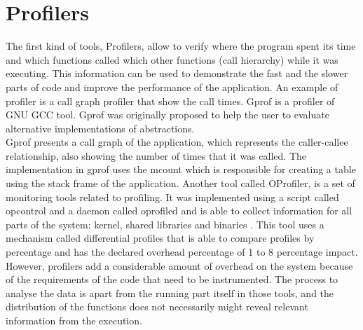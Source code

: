 \section{Profilers}
The first kind of tools, Profilers, allow to verify where the program spent its time and which functions called which other functions (call hierarchy) while it was executing. This information can be used to demonstrate the fast and the slower parts of code and improve the performance of the application.
An example of profiler is a call graph profiler that show the call times. Gprof is a profiler of GNU GCC tool. Gprof was originally proposed to help the user to evaluate alternative implementations of abstractions.\\
Gprof presents a call graph of the application, which represents the caller-callee relationship, also showing the number of times that it was called. The implementation in gprof uses the mcount which is responsible for creating a table using the stack frame of the application.
Another tool called OProfiler, is a set of monitoring tools related to profiling. It was implemented using a script called opcontrol and a daemon called oprofiled and is able to collect information for all parts of the system: kernel, shared libraries and binaries \cite{oprofile}. This tool uses a mechanism called differential profiles that is able to compare profiles by percentage and has the declared overhead percentage of 1 to 8 percentage impact.\\
However, profilers add a considerable amount of overhead on the system because of the requirements of the code that need to be instrumented. The process to analyse the data is apart from the running part itself in those tools, and the distribution of the functions does not necessarily might reveal relevant information from the execution.\\

